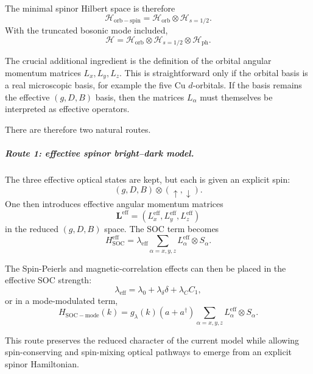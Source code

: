 \documentclass[11pt]{article}
\begin{document}
The minimal spinor Hilbert space is therefore
\begin{equation}
\mathcal{H}_{\mathrm{orb-spin}}
=
\mathcal{H}_{\mathrm{orb}}\otimes\mathcal{H}_{s=1/2}.
\end{equation}
With the truncated bosonic mode included,
\begin{equation}
\mathcal{H}
=
\mathcal{H}_{\mathrm{orb}}
\otimes
\mathcal{H}_{s=1/2}
\otimes
\mathcal{H}_{\mathrm{ph}}.
\end{equation}

The crucial additional ingredient is the definition of the orbital angular momentum matrices \(L_x,L_y,L_z\). This is straightforward only if the orbital basis is a real microscopic basis, for example the five Cu \(d\)-orbitals. If the basis remains the effective \((g,D,B)\) basis, then the matrices \(L_\alpha\) must themselves be interpreted as effective operators.

There are therefore two natural routes.

\subparagraph{Route 1: effective spinor bright--dark model.}

The three effective optical states are kept, but each is given an explicit spin:
\begin{equation}
(g,D,B)\otimes(\uparrow,\downarrow).
\end{equation}
One then introduces effective angular momentum matrices
\begin{equation}
\bm{L}^{\mathrm{eff}}
=
\left(
L_x^{\mathrm{eff}},
L_y^{\mathrm{eff}},
L_z^{\mathrm{eff}}
\right)
\end{equation}
in the reduced \((g,D,B)\) space. The SOC term becomes
\begin{equation}
H_{\mathrm{SOC}}^{\mathrm{eff}}
=
\lambda_{\mathrm{eff}}
\sum_{\alpha=x,y,z}
L_\alpha^{\mathrm{eff}}\otimes S_\alpha.
\end{equation}

The Spin-Peierls and magnetic-correlation effects can then be placed in the effective SOC strength:
\begin{equation}
\lambda_{\mathrm{eff}}
=
\lambda_0+\lambda_\delta\delta+\lambda_C C_1,
\end{equation}
or in a mode-modulated term,
\begin{equation}
H_{\mathrm{SOC-mode}}(k)
=
g_\lambda(k)(a+a^\dagger)
\sum_{\alpha=x,y,z}
L_\alpha^{\mathrm{eff}}\otimes S_\alpha.
\end{equation}

This route preserves the reduced character of the current model while allowing spin-conserving and spin-mixing optical pathways to emerge from an explicit spinor Hamiltonian.
\end{document}
